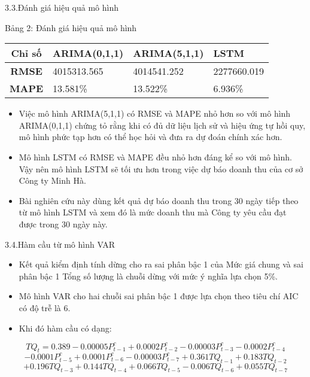 \documentclass{beamer}
\begin{document}
	\begin{frame}{3.3.Đánh giá hiệu quả mô hình}
		\begin{table}[h]
			\centering
			Bảng 2: Đánh giá hiệu quả mô hình
			
			\begin{tabularx}{\textwidth}{|c|X|X|X|}
				\hline
				\textbf{Chỉ số} & ARIMA(0,1,1) & ARIMA(5,1,1) & LSTM  \\ \hline
				\textbf{RMSE} & 4015313.565 & 4014541.252 & 2277660.019 \\ \hline
				\textbf{MAPE} & 13.581\% & 13.522\% & 6.936\% \\ \hline
			\end{tabularx}
		\end{table}
		
		\begin{itemize} %
			\item Việc mô hình ARIMA(5,1,1) có RMSE và MAPE nhỏ hơn so với mô hình ARIMA(0,1,1) chứng tỏ rằng khi có đủ dữ liệu lịch sử và hiệu ứng tự hồi quy, mô hình phức tạp hơn có thể học hỏi và đưa ra dự đoán chính xác hơn.
			
			\item Mô hình LSTM có RMSE và MAPE đều nhỏ hơn đáng kể so với mô hình. Vậy nên mô hình LSTM sẽ tối ưu hơn trong việc dự báo doanh thu của cơ sở Công ty Minh Hà.
			\item  Bài nghiên cứu này dùng kết quả dự báo doanh thu trong 30 ngày tiếp theo từ mô hình LSTM và xem đó là mức doanh thu mà Công ty yêu cầu đạt được trong 30 ngày này. 
		\end{itemize}
		
	\end{frame}
	
    \begin{frame}{3.4.Hàm cầu từ mô hình VAR}
    	\begin{itemize}
    	    \item Kết quả kiểm định tính dừng cho ra sai phân bậc 1 của Mức giá chung và sai phân bậc 1 Tổng số lượng là chuỗi dừng với mức ý nghĩa lựa chọn 5\%.
    	    \item Mô hình VAR cho hai chuỗi sai phân bậc 1 được lựa chọn theo tiêu chí AIC có độ trễ là 6.
    	    \item Khi đó hàm cầu có dạng:
    	\end{itemize}
    	    \[
    	    TQ_t = 0.389 - 0.00005P_{t-1}^c + 0.0002P_{t-2}^c - 0.00003 P_{t-3}^c - 0.0002P_{t-4}^c
    	    \]
    	    \[
        	- 0.0001P_{t-5}^c + 0.0001P_{t-6}^c - 0.00003  P_{t-7}^c
        	+ 0.361 TQ_{t-1} + 0.183 TQ_{t-2}
    	    \]
    	    \[
    	    + 0.196  TQ_{t-3} + 0.144  TQ_{t-4} + 0.066TQ_{t-5}
    	    - 0.006TQ_{t-6} + 0.055TQ_{t-7}
    	    \]
    	
    \end{frame}
	
\end{document}

